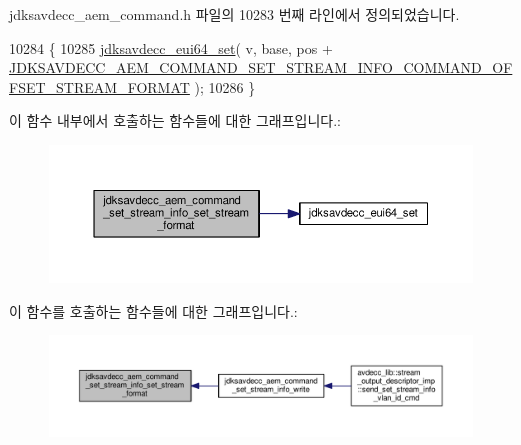 jdksavdecc\+\_\+aem\+\_\+command.\+h 파일의 10283 번째 라인에서 정의되었습니다.


\begin{DoxyCode}
10284 \{
10285     \hyperlink{group__eui64_ga1c5b342315464ff77cbc7d587765432d}{jdksavdecc\_eui64\_set}( v, base, pos + 
      \hyperlink{group__command__set__stream__info_gad1e39931a6700da6d1227bcfba9583b1}{JDKSAVDECC\_AEM\_COMMAND\_SET\_STREAM\_INFO\_COMMAND\_OFFSET\_STREAM\_FORMAT}
       );
10286 \}
\end{DoxyCode}


이 함수 내부에서 호출하는 함수들에 대한 그래프입니다.\+:
\nopagebreak
\begin{figure}[H]
\begin{center}
\leavevmode
\includegraphics[width=350pt]{group__command__set__stream__info_ga4a70a7a66d1a6cf75e5e924fdbc9cd0a_cgraph}
\end{center}
\end{figure}




이 함수를 호출하는 함수들에 대한 그래프입니다.\+:
\nopagebreak
\begin{figure}[H]
\begin{center}
\leavevmode
\includegraphics[width=350pt]{group__command__set__stream__info_ga4a70a7a66d1a6cf75e5e924fdbc9cd0a_icgraph}
\end{center}
\end{figure}


